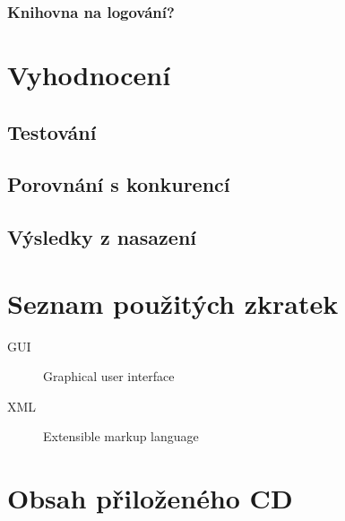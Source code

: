 \documentclass[thesis=B,czech,hidelinks]{FITthesis}[2019/03/06]
\begin{document}
\subsection{Knihovna na logování?}


\chapter{Vyhodnocení}
\section{Testování}
\section{Porovnání s konkurencí}
\section{Výsledky z nasazení}

\begin{conclusion}
\end{conclusion}

\printbibliography{}

\appendix

\chapter{Seznam použitých zkratek}
\begin{description}
    \item[GUI] Graphical user interface
    \item[XML] Extensible markup language
\end{description}

\chapter{Obsah přiloženého CD}

\end{document}

